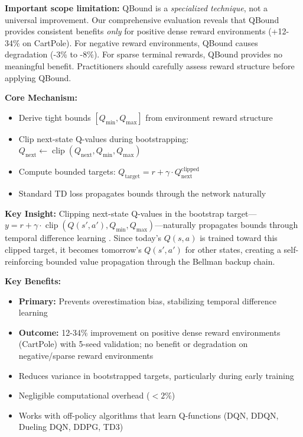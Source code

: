 \documentclass[11pt]{article}
\theoremstyle{definition}
\theoremstyle{remark}
\DeclareMathOperator{\clip}{clip}
\begin{document}
\textbf{Important scope limitation:} QBound is a \textit{specialized technique}, not a universal improvement. Our comprehensive evaluation reveals that QBound provides consistent benefits \textit{only} for positive dense reward environments (+12-34\% on CartPole). For negative reward environments, QBound causes degradation (-3\% to -8\%). For sparse terminal rewards, QBound provides no meaningful benefit. Practitioners should carefully assess reward structure before applying QBound.

\textbf{Core Mechanism:}
\begin{itemize}
    \item Derive tight bounds $[Q_{\min}, Q_{\max}]$ from environment reward structure
    \item Clip next-state Q-values during bootstrapping: $Q_{\text{next}} \gets \clip(Q_{\text{next}}, Q_{\min}, Q_{\max})$
    \item Compute bounded targets: $Q_{\text{target}} = r + \gamma \cdot Q_{\text{next}}^{\text{clipped}}$
    \item Standard TD loss propagates bounds through the network naturally
\end{itemize}

\textbf{Key Insight:} Clipping next-state Q-values in the bootstrap target—$y = r + \gamma \cdot \clip(Q(s',a'), Q_{\min}, Q_{\max})$—naturally propagates bounds through temporal difference learning \citep{sutton2018reinforcement}. Since today's $Q(s,a)$ is trained toward this clipped target, it becomes tomorrow's $Q(s',a')$ for other states, creating a self-reinforcing bounded value propagation through the Bellman backup chain.

\textbf{Key Benefits:}
\begin{itemize}
    \item \textbf{Primary:} Prevents overestimation bias, stabilizing temporal difference learning \citep{sutton2018reinforcement}
    \item \textbf{Outcome:} 12-34\% improvement on positive dense reward environments (CartPole) with 5-seed validation; no benefit or degradation on negative/sparse reward environments
    \item Reduces variance in bootstrapped targets, particularly during early training
    \item Negligible computational overhead ($<2\%$)
    \item Works with off-policy algorithms that learn Q-functions (DQN, DDQN, Dueling DQN, DDPG, TD3)
\end{itemize}
\end{document}
